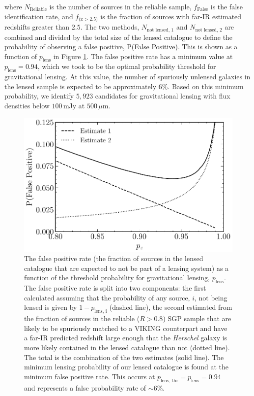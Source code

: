 \noindent where $N_{\textrm{Reliable}}$ is the number of sources in the reliable sample, $f_{\textrm{False}}$ is the false identification rate, and $f_{\textrm{(z > 2.5)}}$ is the fraction of sources with far-IR estimated redshifts greater than $2.5$. The two methods, $N_{\textrm{not lensed, 1}}$ and $N_{\textrm{not lensed, 2}}$ are combined and divided by the total size of the lensed catalogue to define the probability of observing a false positive, P(False Positive). This is shown as a function of $p_{\textrm{lens}}$ in Figure \ref{fig:lens_false_positive}. The false positive rate has a minimum value at $p_\textrm{lens} = 0.94$, which we took to be the optimal probability threshold for gravitational lensing. At this value, the number of spuriously unlensed galaxies in the lensed sample is expected to be approximately $6\%$. Based on this minimum probability, we identify $5,923$ candidates for gravitational lensing with flux densities below $100\,$mJy at $500\,\mu$m.

\begin{figure}
    \centering
    \includegraphics[width=0.8\columnwidth]{Figures/lens_false_positive.pdf}
    \caption[Fraction of unlensed sources in our lensed sample as a function of $p_\textrm{lens}$]{The false positive rate (the fraction of sources in the lensed catalogue that are expected to not be part of a lensing system) as a function of the threshold probability for gravitational lensing, $p_\textrm{lens}$. The false positive rate is split into two components: the first calculated assuming that the probability of any source, $i$, not being lensed is given by $1 - p_{\textrm{lens, i}}$ (dashed line), the second estimated from the fraction of sources in the reliable ($R > 0.8$) SGP sample that are likely to be spuriously matched to a VIKING counterpart and have a far-IR predicted redshift large enough that the \textit{Herschel} galaxy is more likely contained in the lensed catalogue than not (dotted line). The total is the combination of the two estimates (solid line). The minimum lensing probability of our lensed catalogue is found at the minimum false positive rate. This occurs at $p_\textrm{lens, thr} = p_\textrm{lens} = 0.94$ and represents a false probability rate of $\sim 6\%$.}
    \label{fig:lens_false_positive}
\end{figure}

